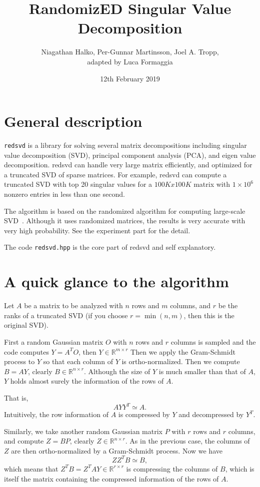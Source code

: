 \documentclass{article}
\title{RandomizED Singular Value Decomposition}
\author{Niagathan Halko, Per-Gunnar Martinsson, Joel A. Tropp,\\ adapted
  by Luca Formaggia}
\date{12th February 2019}
\begin{document}
\maketitle
\section{General description}
\texttt{redsvd} is a library for solving several matrix decompositions
including singular value decomposition (SVD), principal component
analysis (PCA), and eigen value decomposition. redsvd can handle very
large matrix efficiently, and optimized for a truncated SVD of sparse
matrices. For example, redsvd can compute a truncated SVD with top 20
singular values for a $100K x 100K$ matrix with $1\times 10^6$ nonzero entries in
less than one second.

The algorithm is based on the randomized algorithm for computing
large-scale SVD~\cite{Haiko11}. Although it uses randomized matrices,
the results is very accurate with very high probability. See the
experiment part for the detail.

The code \texttt{redsvd.hpp} is the core part of redsvd and self explanatory.

\section{A quick glance to the algorithm}
Let $A$ be a matrix to be analyzed with $n$ rows and $m$ columns, and $r$ be
the ranks of a truncated SVD (if you choose $r = \min(n, m)$, then this
is the original SVD).

First a random Gaussian matrix $O$ with $n$ rows and $r$ columns is sampled
and the code computes $Y = A^T O$, then $Y\in\mathbb{R}^{m\times r}$
Then we apply the Gram-Schmidt
process to $Y$ so that each column of $Y$ is ortho-normalized. Then we
compute $B = AY$, clearly $B\in\mathbb{R}^{n\times r}$. Although the size of $Y$ is
much smaller than that of $A$, $Y$ holds almost surely the information of the rows of $A$.

That is,
\[
  AYY^T\simeq A.
\]
Intuitively, the row information of $A$ is compressed by $Y$ and
decompressed by $Y^T$.

Similarly, we take another random Gaussian matrix $P$ with $r$ rows
and $r$ columns, and compute $Z = BP$, clearly $Z\in\mathbb{R}^{n\times r}$. As in the previous case, the
columns of $Z$ are then ortho-normalized by a Gram-Schmidt process. Now
we have
\[
ZZ^T B \simeq B,
\]
which means that $Z^TB=Z^{T}AY\in\mathbb{R}^{r\times r}$ is compressing the columns of $B$, which is itself the matrix containing the
compressed information of the rows of $A$.
\end{document}

